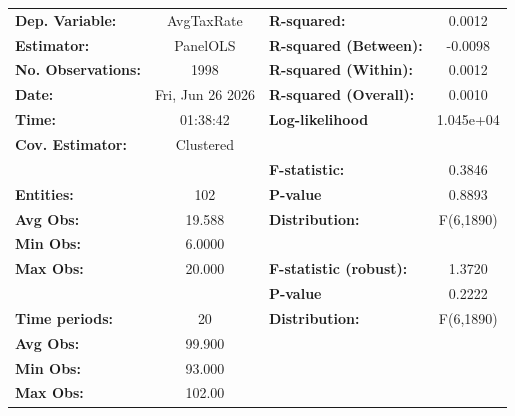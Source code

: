 \begin{center}
\begin{tabular}{lclc}
\toprule
\textbf{Dep. Variable:}                       &     AvgTaxRate     & \textbf{  R-squared:         }   &      0.0012      \\
\textbf{Estimator:}                           &      PanelOLS      & \textbf{  R-squared (Between):}  &     -0.0098      \\
\textbf{No. Observations:}                    &        1998        & \textbf{  R-squared (Within):}   &      0.0012      \\
\textbf{Date:}                                &  Fri, Jun 26 2026  & \textbf{  R-squared (Overall):}  &      0.0010      \\
\textbf{Time:}                                &      01:38:42      & \textbf{  Log-likelihood     }   &    1.045e+04     \\
\textbf{Cov. Estimator:}                      &     Clustered      & \textbf{                     }   &                  \\
\textbf{}                                     &                    & \textbf{  F-statistic:       }   &      0.3846      \\
\textbf{Entities:}                            &        102         & \textbf{  P-value            }   &      0.8893      \\
\textbf{Avg Obs:}                             &       19.588       & \textbf{  Distribution:      }   &    F(6,1890)     \\
\textbf{Min Obs:}                             &       6.0000       & \textbf{                     }   &                  \\
\textbf{Max Obs:}                             &       20.000       & \textbf{  F-statistic (robust):} &      1.3720      \\
\textbf{}                                     &                    & \textbf{  P-value            }   &      0.2222      \\
\textbf{Time periods:}                        &         20         & \textbf{  Distribution:      }   &    F(6,1890)     \\
\textbf{Avg Obs:}                             &       99.900       & \textbf{                     }   &                  \\
\textbf{Min Obs:}                             &       93.000       & \textbf{                     }   &                  \\
\textbf{Max Obs:}                             &       102.00       & \textbf{                     }   &                  \\

\end{tabular}
\end{center}
